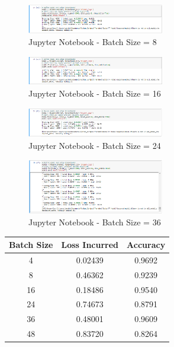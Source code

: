 \documentclass[conference,compsoc]{IEEEtran}
\begin{document}
\begin{figure}[H]
    \centering
    \includegraphics[width=6cm]{screenshots/jupyter-notebook/batch-size-8.png}
    \caption{Jupyter Notebook - Batch Size = 8}
\end{figure}

\begin{figure}[H]
    \centering
    \includegraphics[width=6cm]{screenshots/jupyter-notebook/batch-size-16.png}
    \caption{Jupyter Notebook - Batch Size = 16}
\end{figure}

\begin{figure}[H]
    \centering
    \includegraphics[width=6cm]{screenshots/jupyter-notebook/batch-size-24.png}
    \caption{Jupyter Notebook - Batch Size = 24}
\end{figure}

\begin{figure}[H]
    \centering
    \includegraphics[width=6cm]{screenshots/jupyter-notebook/batch-size-36.png}
    \caption{Jupyter Notebook - Batch Size = 36}
\end{figure}

\begin{center}
    \begin{tabular}{ |c|c|c| } 
        \hline
        Batch Size & Loss Incurred & Accuracy \\ [0.5ex]
        \hline\hline
        4 & 0.02439 & 0.9692 \\
        8 & 0.46362 & 0.9239 \\
        16 & 0.18486 & 0.9540 \\
        24 & 0.74673 & 0.8791 \\
        36 & 0.48001 & 0.9609 \\
        48 & 0.83720 & 0.8264 \\
        \hline
    \end{tabular}
\end{center}
\end{document}
